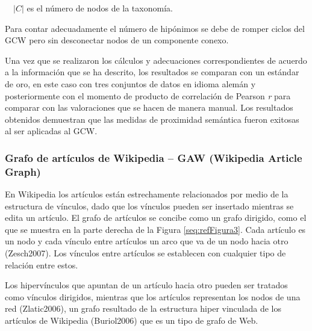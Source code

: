 \documentclass[letterpaper]{article}
\newcommand\textstylebibuscitbase[1]{#1}
\newcounter{Figura}
\begin{document}
{\sffamily
\ \  $|C|$ es el n\'umero de nodos de la taxonom\'ia.}


\bigskip

{\sffamily
Para contar adecuadamente el n\'umero de hip\'onimos se debe de romper
ciclos del GCW pero sin desconectar nodos de un componente conexo.%
}


\bigskip

{\sffamily
Una vez que se realizaron los c\'alculos y adecuaciones correspondientes
de acuerdo a la informaci\'on que se ha descrito, los resultados se
comparan con un est\'andar de oro, en este caso con tres conjuntos de
datos en idioma alem\'an y posteriormente con el momento de producto de
correlaci\'on de Pearson \textit{r }para comparar con las valoraciones
que se hacen de manera manual. Los resultados obtenidos demuestran que
las medidas de proximidad sem\'antica fueron exitosas al ser aplicadas
al GCW.}


\bigskip

\subsubsection[Grafo de art\'iculos de Wikipedia {}-- GAW (Wikipedia
Article Graph)]{Grafo de art\'iculos de Wikipedia -- GAW (Wikipedia
Article Graph)}
\hypertarget{RefHeading10780782078703}{}
\bigskip

{\sffamily
En Wikipedia los art\'iculos est\'an estrechamente relacionados por
medio de la estructura de v\'inculos, dado que los v\'inculos pueden
ser insertado mientras se edita un art\'iculo. El grafo de art\'iculos
se concibe como un grafo dirigido, como el que se muestra en la parte
derecha de la Figura \ref{seq:refFigura3}. Cada art\'iculo es un nodo y
cada v\'inculo entre art\'iculos un arco que va de un nodo hacia otro
\textstylebibuscitbase{(Zesch2007)}. Los v\'inculos entre art\'iculos
se establecen con cualquier tipo de relaci\'on entre estos.}


\bigskip

{\sffamily
Los hiperv\'inculos que apuntan de un art\'iculo hacia otro pueden ser
tratados como v\'inculos dirigidos, mientras que los art\'iculos
representan los nodos de una red
\textstylebibuscitbase{(Zlatic2006)}\textstylebibuscitbase{, un grafo
resultado de la estructura hiper vinculada de los art\'iculos de
Wikipedia }\textstylebibuscitbase{(Buriol2006)}\textstylebibuscitbase{
que es un tipo de grafo de Web. }}
\end{document}
